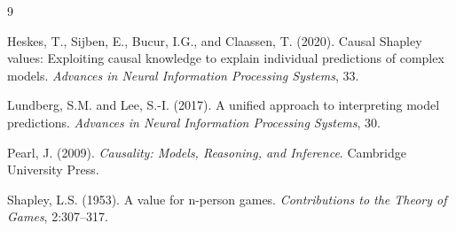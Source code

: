 \documentclass[12pt]{article}
\begin{document}

\begin{thebibliography}{9}

Heskes, T., Sijben, E., Bucur, I.G., and Claassen, T. (2020).
\newblock Causal Shapley values: Exploiting causal knowledge to explain
individual predictions of complex models.
\newblock \emph{Advances in Neural Information Processing Systems}, 33.

Lundberg, S.M. and Lee, S.-I. (2017).
\newblock A unified approach to interpreting model predictions.
\newblock \emph{Advances in Neural Information Processing Systems}, 30.

Pearl, J. (2009).
\newblock \emph{Causality: Models, Reasoning, and Inference}.
\newblock Cambridge University Press.

Shapley, L.S. (1953).
\newblock A value for n-person games.
\newblock \emph{Contributions to the Theory of Games}, 2:307--317.

\end{thebibliography}
\end{document}
